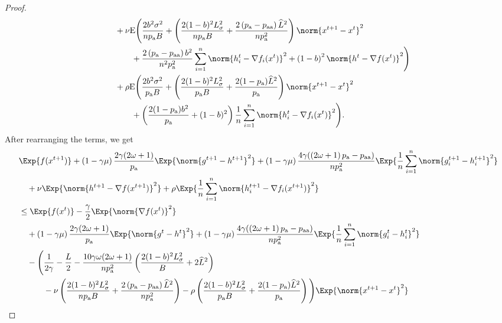 \documentclass{article}
\newcommand*{\probavailable}{\ensuremath{p_{\textnormal{a}}}}
\newcommand*{\probpairaa}{\ensuremath{p_{\textnormal{aa}}}}
\begin{document}
\begin{proof}
\begin{align*}
        &\quad  + \nu {\rm E}\Bigg(\frac{2 b^2 \sigma^2}{n \probavailable B} + \left(\frac{2 (1 - b)^2 L_{\sigma}^2}{n \probavailable B} + \frac{2\left(\probavailable - \probpairaa\right) \widehat{L}^2}{n \probavailable^2} \right) \norm{x^{t+1} - x^{t}}^2\\
        &\qquad\quad + \frac{2 \left(\probavailable - \probpairaa\right) b^2}{n^2 \probavailable^2} \sum_{i=1}^n \norm{h^t_i - \nabla f_i(x^{t})}^2 + \left(1 - b\right)^2 \norm{h^{t} - \nabla f(x^{t})}^2\Bigg) \\
        &\quad + \rho {\rm E}\Bigg(\frac{2 b^2 \sigma^2}{\probavailable B}  + \left(\frac{2 (1 - b)^2 L_{\sigma}^2}{\probavailable B} + \frac{2(1 - \probavailable) \widehat{L}^2}{\probavailable}\right)\norm{x^{t+1} - x^{t}}^2 \\
        &\qquad\quad + \left(\frac{2 (1 - \probavailable) b^2}{\probavailable} + (1 - b)^2\right) \frac{1}{n} \sum_{i=1}^n \norm{h^t_i - \nabla f_i(x^{t})}^2\Bigg).
      \end{align*}
      After rearranging the terms, we get
      \begin{align*}
        &\Exp{f(x^{t + 1})} + \left(1 - \gamma \mu\right)\frac{2\gamma (2 \omega + 1)}{\probavailable} \Exp{\norm{g^{t+1} - h^{t+1}}^2} + \left(1 - \gamma \mu\right)\frac{4\gamma (\left(2 \omega + 1\right)\probavailable - \probpairaa)}{n \probavailable^2} \Exp{\frac{1}{n}\sum_{i=1}^n\norm{g^{t+1}_i - h^{t+1}_i}^2}\\
        &\quad  + \nu \Exp{\norm{h^{t+1} - \nabla f(x^{t+1})}^2} + \rho \Exp{\frac{1}{n}\sum_{i=1}^n\norm{h^{t+1}_i - \nabla f_i(x^{t+1})}^2}\\
        &\leq \Exp{f(x^t)} - \frac{\gamma}{2}\Exp{\norm{\nabla f(x^t)}^2} \\
        &\quad + \left(1 - \gamma \mu\right)\frac{2\gamma (2 \omega + 1)}{\probavailable} \Exp{\norm{g^{t} - h^{t}}^2} + \left(1 - \gamma \mu\right)\frac{4\gamma (\left(2 \omega + 1\right)\probavailable - \probpairaa)}{n \probavailable^2} \Exp{\frac{1}{n}\sum_{i=1}^n\norm{g^{t}_i - h^{t}_i}^2} \\
        &\quad - \Bigg(\frac{1}{2\gamma} - \frac{L}{2} - \frac{10 \gamma \omega (2 \omega + 1)}{n \probavailable^2} \left(\frac{2 (1 - b)^2 L_{\sigma}^2}{B} + 2 \widehat{L}^2\right) \\
        &\qquad\quad - \nu\left(\frac{2 (1 - b)^2 L_{\sigma}^2}{n \probavailable B} + \frac{2\left(\probavailable - \probpairaa\right) \widehat{L}^2}{n \probavailable^2} \right) - \rho \left(\frac{2 (1 - b)^2 L_{\sigma}^2}{\probavailable B} + \frac{2(1 - \probavailable) \widehat{L}^2}{\probavailable}\right)\Bigg) \Exp{\norm{x^{t+1} - x^t}^2} \\

\end{align*}
\end{proof}
\end{document}
